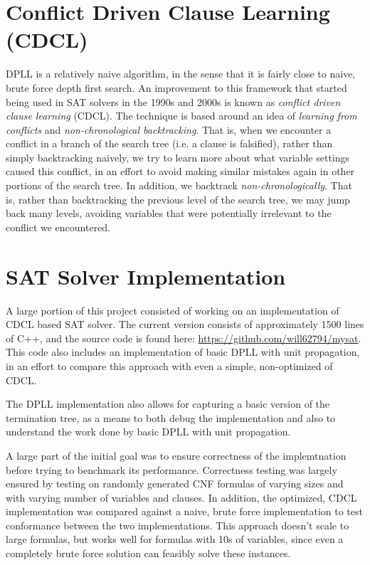\documentclass[12pt]{article}
\begin{document}
%     

\section{Conflict Driven Clause Learning (CDCL)}

DPLL is a relatively naive algorithm, in the sense that it is fairly close to naive, brute force depth first search. An improvement to this framework that started being used in SAT solvers in the 1990s and 2000s is known as \textit{conflict driven clause learning} (CDCL). The technique is based around an idea of \textit{learning from conflicts} and \textit{non-chronological backtracking}. That is, when we encounter a conflict in a branch of the search tree (i.e. a clause is falsified), rather than simply backtracking naively, we try to learn more about what variable settings caused this conflict, in an effort to avoid making similar mistakes again in other portions of the search tree. In addition, we backtrack \textit{non-chronologically}. That is, rather than backtracking the previous level of the search tree, we may jump back many levels, avoiding variables that were potentially irrelevant to the conflict we encountered.

\section{SAT Solver Implementation}

A large portion of this project consisted of working on an implementation of CDCL based SAT solver. The current version consists of approximately 1500 lines of C++, and the source code is found here: \url{https://github.com/will62794/mysat}. This code also includes an implementation of basic DPLL with unit propagation, in an effort to compare this approach with even a simple, non-optimized of CDCL.

The DPLL implementation also allows for capturing a basic version of the termination tree, as a means to both debug the implementation and also to understand the work done by basic DPLL with unit propagation.


A large part of the initial goal was to ensure correctness of the implemtnation before trying to benchmark its performance. Correctness testing was largely ensured by testing on randomly generated CNF formulas of varying sizes and with varying number of variables and clauses. In addition, the optimized, CDCL implementation was compared against a naive, brute force implementation to test conformance between the two implementations. This approach doesn't scale to large formulas, but works well for formulas with 10s of variables, since even a completely brute force solution can feasibly solve these instances.
\end{document}

